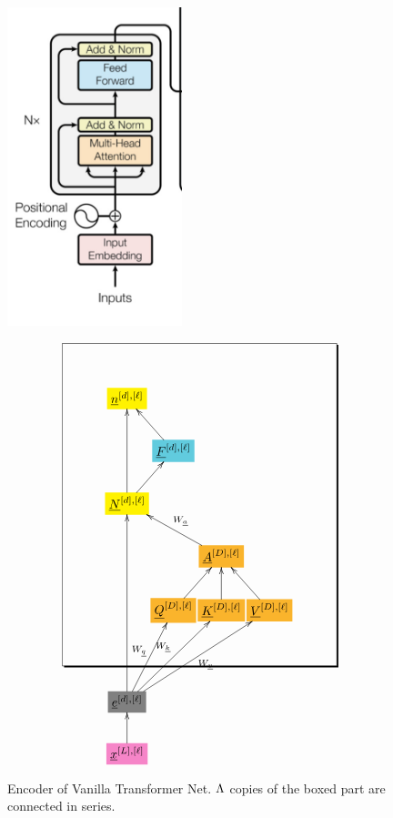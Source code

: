 \begin{figure}[h!]\centering
\begin{minipage}{.4\linewidth}
\includegraphics[width=2in]{transformer/encoder.jpg}
\end{minipage}%
\begin{minipage}{.6\linewidth}
$$\xymatrix@R=2pc@C=0.1pc{
*+[F*:yellow]{\underline{n}^{[d], [\ell]}}&&&
\\
&*+[F*:SkyBlue]{\underline{F}^{[d], [\ell]}}\ar[ul]&&
\\
*+[F*:yellow]{\underline{N}^{[d], [\ell]}}\ar[ur]\ar[uu]&&&
\\
&&*+[F*:Dandelion]{\underline{A}^{[D], [\ell]}}\ar[ull]_{W_\rva}&
\\
&*+[F*:Dandelion]{\underline{Q}^{[D], [\ell]}}\ar[ur]&*+[F*:Dandelion]{\underline{K}^{[D], [\ell]}}\ar[u]&*+[F*:Dandelion]{\underline{V}^{[D], [\ell]}}\ar[ul]
\\
&&&
\\
*+[F*:gray]{\underline{e}^{[d], [\ell]}}\ar[uurr]^{W_\rvk}\ar[uuuu]\ar[uur]^{W_\rvq}\ar[uurrr]_{W_\rvv}&&&
\\
*+[F*:Lavender]{\underline{x}^{[L],[\ell]}}\ar[u]&&&
\save
\POS"1,1"."5,1"."1,4"."5,4"!C*+<7.0em>\frm{-,}
\restore
}$$
\end{minipage}
\caption{Encoder of Vanilla Transformer Net. $\Lambda$ copies of the boxed part are connected in series.}
\label{fig-texnn-for-encoder}
\end{figure}

